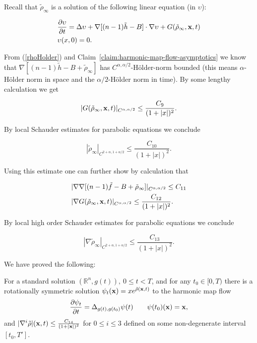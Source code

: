 Recall that $\tilde\rho_\infty$ is a solution of the following
linear equation (in $\upsilon$):

\begin{align*}
& \frac{\partial \upsilon }{\partial t} = \Delta \upsilon + \nabla [
(n-1)\tilde{h} -B] \cdot \nabla \upsilon
+G( \tilde{\rho}_\infty,{\bf x},t) \\
& \upsilon(x,0)=0.
\end{align*}

From (\ref{rhoHolder}) and Claim~\ref{claim:harmonic-map-flow-asymptotics} we know that $\nabla [
(n-1)\tilde{h} -B+ \tilde{\rho}_\infty ]$ has
$C^{\alpha,\alpha/2}$-H\"older-norm bounded (this means
$\alpha$-H\"older norm in space and the $\alpha/2$-H\"older norm in
time). By some lengthy calculation we
 get

\[
| G(\tilde{\rho}_\infty,{\bf x},t)|_{C^{\alpha,\alpha/2}} \leq
\frac{C_9}{(1+|x|)^2}.
\]

By local Schauder estimates for parabolic equations we conclude

\[
|\tilde{\rho}_\infty |_{C^{2+\alpha,1+\alpha/2}} \leq
\frac{C_{10}}{(1+|x|)^2}.
\]

Using this estimate one can further show by calculation that

\begin{align*}
& |\nabla \nabla [ (n-1)\tilde{f} -B+
\tilde{\rho}_\infty ] |_{C^{\alpha,\alpha/2}} \leq C_{11} \\
& |\nabla G(\tilde{\rho}_\infty,{\bf x},t)|_{C^{\alpha,\alpha/2}}
\leq \frac{C_{12}}{(1+|x|)^2}.
\end{align*}

By local high order Schauder estimates for parabolic equations we
conclude

\[
|\nabla \tilde{\rho}_\infty |_{C^{2+\alpha,1+\alpha/2}} \leq
\frac{C_{13}}{(1+|x|)^2}.
 \]

We have proved the following:

\begin{proposition}
\label{prop:harmonic-map-flow-existence-decay}
\label{harmapflow}
For a standard solution $(\mathbb{R}^n,g(t)),\ 0\le t<T$, and for
any $t_0\in [0,T)$ there is a rotationally symmetric solution
$\psi_t({\bf x)} = x e^{\tilde{\rho}({\bf x},t)}$ to the harmonic
map flow
\[
\frac{\partial \psi_t}{\partial t}=\Delta_{g(t),g(t_0)}\psi(t)
\qquad \psi(t_0)({\bf x})={\bf x},
\]
and $ |\nabla^i \tilde{\rho}|({\bf x},t)\leq \frac{C_{14}}{(1+|{\bf
x}|)^2}$ for $0 \leq i \leq 3$ defined on some non-degenerate
interval $[t_0,T']$.
\end{proposition}





